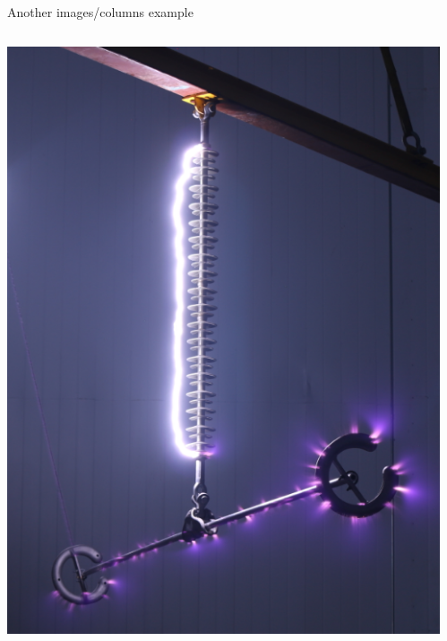 \documentclass{beamer}
\begin{document}
\begin{frame}{Another images/columns example}
\begin{columns}
\begin{column}{0.35\textwidth}
\includegraphics[height=0.8\textheight]{images/back_flashover.png}
\end{column}
\begin{column}{0.3\textwidth}
	

\end{column}
\end{columns}
\end{frame}
\end{document}
